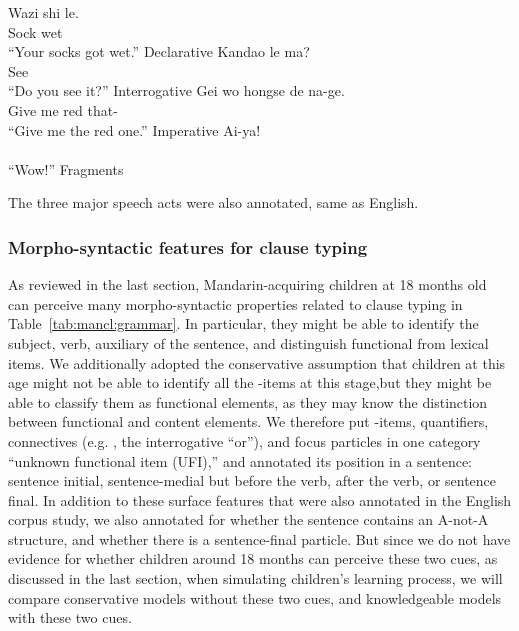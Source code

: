 \bxl \label{ex:mancl:annt:cl:dec}
\gll Wazi shi le.\\
Sock wet \Sfp{}\\
``Your socks got wet.'' \hfill Declarative
\ex \label{ex:mancl:annt:cl:int}
\gll Kandao le ma?\\
See \Asp{} \Sfp{}\\
\trans``Do you see it?''  \hfill Interrogative
\ex \label{ex:mancl:annt:cl:imp}
\gll Gei wo hongse de na-ge.\\
Give me red  that-\Cl{}\\
\trans``Give me the red one.'' \hfill Imperative
\ex \label{ex:mancl:annt:cl:frag}
\gll Ai-ya!\\
 \\
\trans ``Wow!'' \hfill Fragments
\exl
\eex

The three major speech acts were also annotated, same as English.

\subsubsection{Morpho-syntactic features for clause typing}

As reviewed in the last section, Mandarin-acquiring children at 18 months old can perceive many morpho-syntactic properties related to clause typing in Table~\ref{tab:mancl:grammar}. In particular, they might be able to identify the subject, verb, auxiliary of the sentence, and distinguish functional from lexical items. We additionally adopted the conservative assumption that children at this age might not be able to identify all the \twh-items at this stage,but they might be able to classify them as functional elements, as they may know the distinction between functional and content elements. We therefore put \twh-items, quantifiers, connectives (e.g. , the interrogative ``or''), and focus particles in one category ``unknown functional item (UFI),'' and annotated its position in a sentence: sentence initial, sentence-medial but before the verb, after the verb, or sentence final. In addition to these surface features that were also annotated in the English corpus study, we also annotated for whether the sentence contains an A-not-A structure, and whether there is a sentence-final  particle. But since we do not have evidence for whether children around 18 months can perceive these two cues, as discussed in the last section, when simulating children's learning process, we will compare conservative models without these two cues, and knowledgeable models with these two cues.


